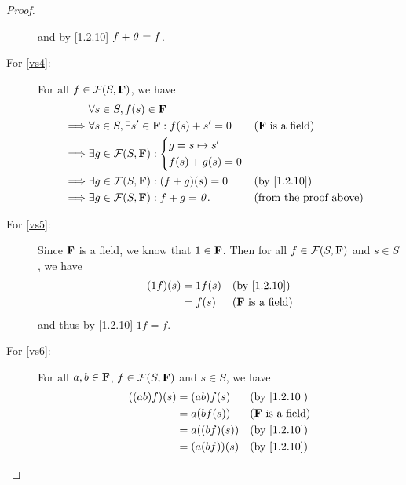 \begin{proof}
\begin{description}
            and by \cref{1.2.10} \(f + \mathit{0} = f\).
        \item[For \ref{vs4}:]
            For all \(f \in \mathcal{F}\p{S, \F}\), we have
            \begin{align*}
                         & \forall s \in S, f\p{s} \in \F                                                                     \\
                \implies & \forall s \in S, \exists s' \in \F : f\p{s} + s' = 0            &  & \text{(\(\F\) is a field)}    \\
                \implies & \exists g \in \mathcal{F}\p{S, \F} : \begin{dcases}
                    g = s \mapsto s' \\
                    f\p{s} + g\p{s} = 0
                \end{dcases}                                    \\
                \implies & \exists g \in \mathcal{F}\p{S, \F} : \p{f + g}\p{s} = 0         &  & \text{(by \cref{1.2.10})}     \\
                \implies & \exists g \in \mathcal{F}\p{S, \F} : f + g = \zv.               &  & \text{(from the proof above)}
            \end{align*}
        \item[For \ref{vs5}:]
            Since \(\mathbf{F}\) is a field, we know that \(1 \in \mathbf{F}\).
            Then for all \(f \in \mathcal{F}\p{S, \F}\) and \(s \in S\), we have
            \begin{align*}
                \p{1f}\p{s} & = 1f\p{s} &  & \text{(by \cref{1.2.10})}  \\
                            & = f\p{s}  &  & \text{(\(\F\) is a field)}
            \end{align*}
            and thus by \cref{1.2.10} \(1f = f\).
        \item[For \ref{vs6}:]
            For all \(a, b \in \mathbf{F}\), \(f \in \mathcal{F}\p{S, \F}\) and \(s \in S\), we have
            \begin{align*}
                \p{\p{ab} f}\p{s} & = \p{ab} f\p{s}     &  & \text{(by \cref{1.2.10})}  \\
                                  & = a \p{b f\p{s}}    &  & \text{(\(\F\) is a field)} \\
                                  & = a \p{\p{bf}\p{s}} &  & \text{(by \cref{1.2.10})}  \\
                                  & = \p{a \p{bf}}\p{s} &  & \text{(by \cref{1.2.10})}

\end{align*}
\end{description}
\end{proof}

